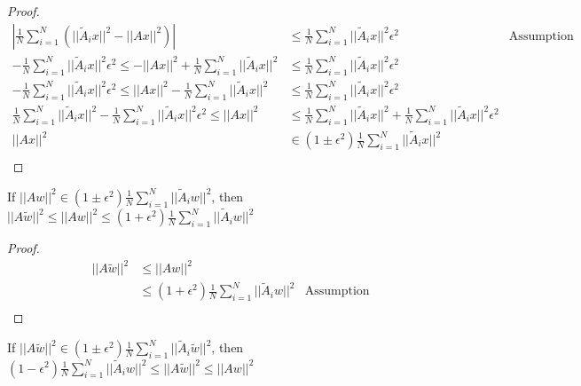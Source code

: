 \begin{proof}
    \begin{align*}
        |\frac{1}{N}\sum_{i=1}^N(||\tilde A_i x||^2 - ||A x||^2)| &\le \frac{1}{N}\sum_{i=1}^N||\tilde A_i x||^2  \epsilon^2 & \text{Assumption}\\
        - \frac{1}{N}\sum_{i=1}^N||\tilde A_i x||^2  \epsilon^2\le - ||A x||^2 + \frac{1}{N}\sum_{i=1}^N||\tilde A_i x||^2 &\le \frac{1}{N}\sum_{i=1}^N||\tilde A_i x||^2 \epsilon^2 & \\
        - \frac{1}{N}\sum_{i=1}^N||\tilde A_i x||^2  \epsilon^2\le ||A x||^2 - \frac{1}{N}\sum_{i=1}^N||\tilde A_i x||^2 &\le \frac{1}{N}\sum_{i=1}^N||\tilde A_i x||^2  \epsilon^2 & \\
        \frac{1}{N}\sum_{i=1}^N||\tilde A_i x||^2 - \frac{1}{N}\sum_{i=1}^N||\tilde A_i x||^2  \epsilon^2\le ||A x||^2 &\le \frac{1}{N}\sum_{i=1}^N||\tilde A_i x||^2 + \frac{1}{N}\sum_{i=1}^N||\tilde A_i x||^2  \epsilon^2 & \\
        ||A x||^2 &\in (1 \pm \epsilon^2)\frac{1}{N}\sum_{i=1}^N||\tilde A_i x||^2 & \\
    \end{align*}
\end{proof}

\begin{lemma}
\label{||Atilde w||^2 le ||Aw||^2 le (1 + epsilon^2)frac1Nsum_i=1^N||tilde A_i w||^2}
    If $||Aw||^2 \in (1 \pm \epsilon^2)\frac{1}{N}\sum_{i=1}^N||\tilde A_i w||^2$, then $||A\tilde w||^2 \le ||Aw||^2 \le (1 + \epsilon^2)\frac{1}{N}\sum_{i=1}^N||\tilde A_i w||^2$
\end{lemma}

\begin{proof}
    \begin{align*}
        ||A\tilde w||^2 &\le ||Aw||^2\\
        &\le (1 + \epsilon^2)\frac{1}{N}\sum_{i=1}^N||\tilde A_i w||^2 & \text{Assumption}\\
    \end{align*}
\end{proof}

\begin{lemma}
\label{(1 - epsilon^2)frac1Nsum_i=1^N||tilde A_i w||^2 le ||Atilde w||^2 le ||A w||^2}
    If $||A\tilde w||^2 \in (1 \pm \epsilon^2)\frac{1}{N}\sum_{i=1}^N||\tilde A_i \tilde w||^2$, then $(1 - \epsilon^2)\frac{1}{N}\sum_{i=1}^N||\tilde A_i w||^2 \le ||A\tilde w||^2 \le ||A w||^2$
\end{lemma}

